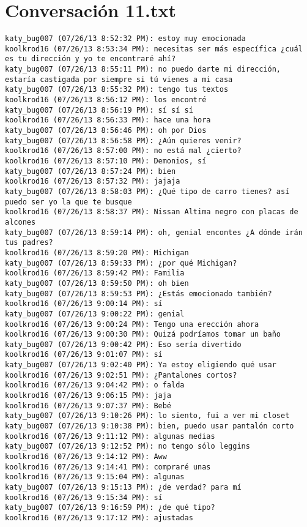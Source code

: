 \section{Conversaci\'on 11.txt}

\begin{verbatim}
katy_bug007 (07/26/13 8:52:32 PM): estoy muy emocionada
koolkrod16 (07/26/13 8:53:34 PM): necesitas ser más específica ¿cuál es tu dirección y yo te encontraré ahí?
katy_bug007 (07/26/13 8:55:11 PM): no puedo darte mi dirección, estaría castigada por siempre si tú vienes a mi casa
katy_bug007 (07/26/13 8:55:32 PM): tengo tus textos 
koolkrod16 (07/26/13 8:56:12 PM): los encontré
katy_bug007 (07/26/13 8:56:19 PM): sí sí sí
koolkrod16 (07/26/13 8:56:33 PM): hace una hora
katy_bug007 (07/26/13 8:56:46 PM): oh por Dios
katy_bug007 (07/26/13 8:56:58 PM): ¿Aún quieres venir?
koolkrod16 (07/26/13 8:57:00 PM): no está mal ¿cierto?
koolkrod16 (07/26/13 8:57:10 PM): Demonios, sí
katy_bug007 (07/26/13 8:57:24 PM): bien
koolkrod16 (07/26/13 8:57:32 PM): jajaja
katy_bug007 (07/26/13 8:58:03 PM): ¿Qué tipo de carro tienes? así puedo ser yo la que te busque
koolkrod16 (07/26/13 8:58:37 PM): Nissan Altima negro con placas de alcones
katy_bug007 (07/26/13 8:59:14 PM): oh, genial encontes ¿A dónde irán tus padres?
koolkrod16 (07/26/13 8:59:20 PM): Michigan
katy_bug007 (07/26/13 8:59:33 PM): ¿por qué Michigan?
koolkrod16 (07/26/13 8:59:42 PM): Familia
katy_bug007 (07/26/13 8:59:50 PM): oh bien
katy_bug007 (07/26/13 8:59:53 PM): ¿Estás emocionado también? 
koolkrod16 (07/26/13 9:00:14 PM): sí
katy_bug007 (07/26/13 9:00:22 PM): genial 
koolkrod16 (07/26/13 9:00:24 PM): Tengo una erección ahora
koolkrod16 (07/26/13 9:00:30 PM): Quizá podríamos tomar un baño
katy_bug007 (07/26/13 9:00:42 PM): Eso sería divertido
koolkrod16 (07/26/13 9:01:07 PM): sí
katy_bug007 (07/26/13 9:02:40 PM): Ya estoy eligiendo qué usar 
koolkrod16 (07/26/13 9:02:51 PM): ¿Pantalones cortos?
koolkrod16 (07/26/13 9:04:42 PM): o falda
koolkrod16 (07/26/13 9:06:15 PM): jaja
koolkrod16 (07/26/13 9:07:37 PM): Bebé
katy_bug007 (07/26/13 9:10:26 PM): lo siento, fui a ver mi closet
katy_bug007 (07/26/13 9:10:38 PM): bien, puedo usar pantalón corto
koolkrod16 (07/26/13 9:11:12 PM): algunas medias
katy_bug007 (07/26/13 9:12:52 PM): no tengo sólo leggins
koolkrod16 (07/26/13 9:14:12 PM): Aww
koolkrod16 (07/26/13 9:14:41 PM): compraré unas
koolkrod16 (07/26/13 9:15:04 PM): algunas 
katy_bug007 (07/26/13 9:15:13 PM): ¿de verdad? para mí
koolkrod16 (07/26/13 9:15:34 PM): sí
katy_bug007 (07/26/13 9:16:59 PM): ¿de qué tipo?
koolkrod16 (07/26/13 9:17:12 PM): ajustadas

\end{verbatim}

